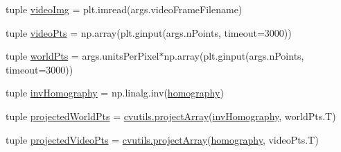 \begin{DoxyCompactItemize}
tuple \hyperlink{namespacecompute-homography_a538236bfe84281da94240c6ae34c38fd}{video\-Img} = plt.\-imread(args.\-video\-Frame\-Filename)
\item 
tuple \hyperlink{namespacecompute-homography_a7240dfc7b627ad67fff9b95427cecd5a}{video\-Pts} = np.\-array(plt.\-ginput(args.\-n\-Points, timeout=3000))
\item 
tuple \hyperlink{namespacecompute-homography_adf35b7c6d4b52afb65b2363d44565358}{world\-Pts} = args.\-units\-Per\-Pixel$\ast$np.\-array(plt.\-ginput(args.\-n\-Points, timeout=3000))
\item 
tuple \hyperlink{namespacecompute-homography_a2c67d96c0e3aacf652dd2737540a3aa9}{inv\-Homography} = np.\-linalg.\-inv(\hyperlink{namespacecompute-homography_a0feea80379e0368958412d7e9b529bd9}{homography})
\item 
tuple \hyperlink{namespacecompute-homography_a2bef6977b46ae10e4de60341d387d4c2}{projected\-World\-Pts} = \hyperlink{namespacecvutils_a0ec21be4fe1491cec23252672d90564c}{cvutils.\-project\-Array}(\hyperlink{namespacecompute-homography_a2c67d96c0e3aacf652dd2737540a3aa9}{inv\-Homography}, world\-Pts.\-T)
\item 
tuple \hyperlink{namespacecompute-homography_a39f7af0562dd06b5fc283541e160732b}{projected\-Video\-Pts} = \hyperlink{namespacecvutils_a0ec21be4fe1491cec23252672d90564c}{cvutils.\-project\-Array}(\hyperlink{namespacecompute-homography_a0feea80379e0368958412d7e9b529bd9}{homography}, video\-Pts.\-T)
\end{DoxyCompactItemize}


